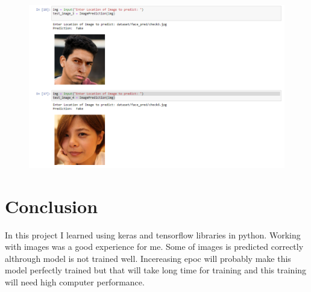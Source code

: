 \documentclass[onecolumn]{article}
\begin{document}
\begin{figure}[H]
\centering
    \includegraphics[width=1\linewidth]{res2.png}
\caption{}
\end{figure}


\section{Conclusion}
In this project I learned using keras and tensorflow libraries in python. Working with images was a good experience for me. Some of images is predicted correctly althrough model is not trained well. Incereasing epoc will probably make this model perfectly trained but that will take long time for training and this training will need high computer performance.


\nocite{*}


\end{document}
